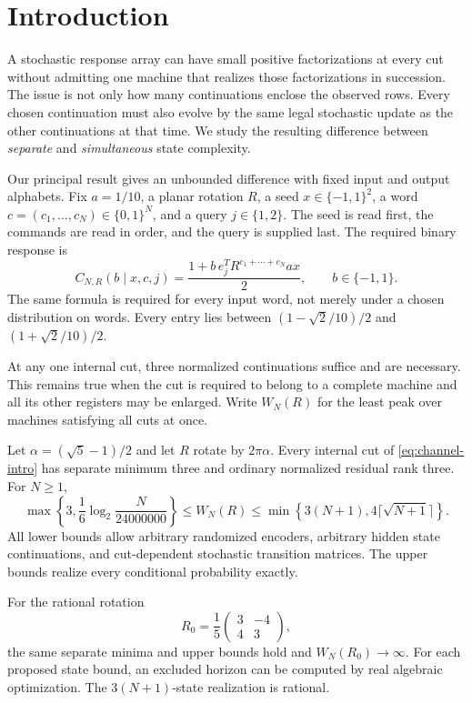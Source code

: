 \section{Introduction}
A stochastic response array can have small positive factorizations at
every cut without admitting one machine that realizes those
factorizations in succession. The issue is not only how many
continuations enclose the observed rows. Every chosen continuation must
also evolve by the same legal stochastic update as the other
continuations at that time. We study the resulting difference between
\emph{separate} and \emph{simultaneous} state complexity.

Our principal result gives an unbounded difference with fixed input and
output alphabets. Fix $a=1/10$, a planar rotation $R$, a seed
$x\in\{-1,1\}^2$, a word $c=(c_1,\ldots,c_N)\in\{0,1\}^N$, and a
query $j\in\{1,2\}$. The seed is read first, the commands are read in
order, and the query is supplied last. The required binary response is
\begin{equation}\label{eq:channel-intro}
 C_{N,R}(b\mid x,c,j)
       =\frac{1+b\,e_j^T R^{c_1+\cdots+c_N}a x}{2},
       \qquad b\in\{-1,1\}.
\end{equation}
The same formula is required for every input word, not merely under a
chosen distribution on words. Every entry lies between
$(1-\sqrt2/10)/2$ and $(1+\sqrt2/10)/2$.

At any one internal cut, three normalized continuations suffice and are
necessary. This remains true when the cut is required to belong to a
complete machine and all its other registers may be enlarged. Write
$W_N(R)$ for the least peak over machines satisfying all cuts at once.

\begin{theorem}
\label{thm:headline}
Let $\alpha=(\sqrt5-1)/2$ and let $R$ rotate by $2\pi\alpha$.
Every internal cut of \eqref{eq:channel-intro} has separate minimum three
and ordinary normalized residual rank three. For $N\ge1$,
\begin{equation}\label{eq:headline}
 \max\left\{3,\frac16\log_2\frac{N}{24000000}\right\}
 \le W_N(R)\le
 \min\left\{3(N+1),4\lceil\sqrt{N+1}\rceil\right\}.
\end{equation}
All lower bounds allow arbitrary randomized encoders, arbitrary hidden
state continuations, and cut-dependent stochastic transition matrices.
The upper bounds realize every conditional probability exactly.

For the rational rotation
\begin{equation}\label{eq:rational-rotation}
 R_0=\frac15\begin{pmatrix}3&-4\\4&3\end{pmatrix},
\end{equation}
the same separate minima and upper bounds hold and $W_N(R_0)\to\infty$.
For each proposed state bound, an excluded horizon can be computed by
real algebraic optimization. The $3(N+1)$-state realization is rational.
\end{theorem}

